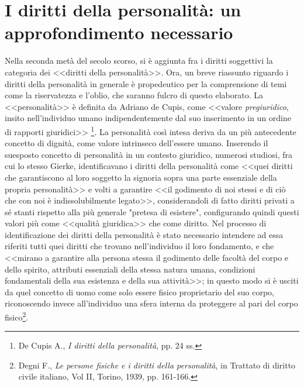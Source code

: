 \section{I diritti della personalità: un approfondimento necessario}
Nella seconda metà del secolo scorso, si è aggiunta fra i diritti soggettivi la categoria dei <<diritti della personalità>>. 
Ora, un breve riassunto riguardo i diritti della personalità in generale è propedeutico per la comprensione di temi come la riservatezza e l'oblio, che saranno fulcro di questo elaborato.
La <<personalità>> è definita da Adriano de Cupis, come <<valore \textit{pregiuridico}, insito nell'individuo umano indipendentemente dal suo inserimento in un ordine di rapporti giuridici>>
\footnote{De Cupis A., \textit{I diritti della personalità}, pp. 24 ss.}. 
La personalità così intesa deriva da un più antecedente concetto di dignità, come valore intrinseco dell'essere umano.
Inserendo il suesposto concetto di personalità in un contesto giuridico, numerosi studiosi, fra cui lo stesso Gierke, identificavano i diritti della personalità come <<quei diritti che garantiscono al loro soggetto la signoria sopra una parte essenziale della propria personalità>> e volti a garantire <<il godimento di noi stessi e di ciò che con noi è indissolubilmente legato>>, considerandoli di fatto diritti privati a sé stanti rispetto alla più generale "pretesa di esistere", configurando quindi questi valori più come <<qualità giuridica>> che come diritto. Nel processo di identificazione dei diritti della personalità è stato necessario intendere ad essa riferiti tutti quei diritti che trovano nell'individuo il loro fondamento, e che <<mirano a garantire alla persona stessa il godimento delle facoltà del corpo e dello spirito, attributi essenziali della stessa natura umana, condizioni fondamentali della sua esistenza e della sua attività>>; in questo modo si è usciti da quel concetto di uomo come solo essere fisico proprietario del suo corpo, riconoscendo invece all'individuo una sfera interna da proteggere al pari del corpo fisico\footnote{Degni F., \textit{Le persone fisiche e i diritti della personalità}, in Trattato di diritto civile italiano, Vol II, Torino, 1939, pp. 161-166.}.
